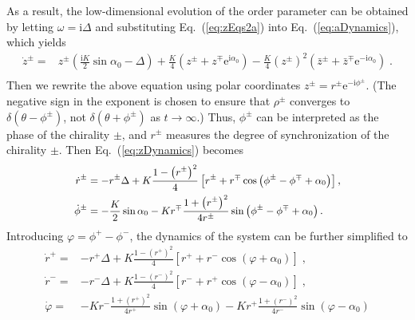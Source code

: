 \documentclass{article}
\begin{document}
As a result, the low-dimensional evolution of the order parameter can be obtained by letting $\omega =\mathrm{i}\Delta$ and substituting Eq.~(\ref{eq:zEqs2a}) into Eq.~(\ref{eq:aDynamics}), which yields
\begin{equation}
    \label{eq:zDynamics}
    \begin{aligned}
        \dot{z}^{\pm}=&z^{\pm}\left( \frac{\text{i}K}{2}\sin \alpha _0 - \Delta \right) +\frac{K}{4}\left( z^{\pm}+z^{\mp}\text{e}^{\text{i}\alpha _0} \right)-\frac{K}{4}\left( z^{\pm} \right) ^2\left( \bar{z}^{\pm}+\bar{z}^{\mp}\text{e}^{-\text{i}\alpha _0} \right) \;.\\
    \end{aligned}
\end{equation}
Then we rewrite the above equation using polar coordinates $z^{\pm}=r^{\pm}\mathrm{e}^{-\mathrm{i}\phi ^{\pm}}$. (The negative sign in the exponent is chosen to ensure that $\rho^{\pm}$ converges to $\delta\left(\theta-\phi^{\pm}\right)$, not $\delta\left(\theta+\phi^{\pm}\right)$ as $t\rightarrow\infty$.) Thus, $\phi^{\pm}$ can be interpreted as the phase of the chirality $\pm$, and $r^{\pm}$ measures the degree of synchronization of the chirality $\pm$. 
Then Eq.~(\ref{eq:zDynamics}) becomes
\begin{subequations}
    \small
    \begin{align}
        \dot{r}^{\pm}&=-r^{\pm}\Delta +K\frac{1 -\left( r^{\pm} \right) ^2}{4}\left[ r^{\pm}+r^{\mp}\cos \left( \phi ^{\pm}-\phi ^{\mp}+\alpha _0 \right) \right] ,\\
        \dot{\phi}^{\pm}&=-\frac{K}{2}\sin \alpha _0-Kr^{\mp}\frac{1+\left( r^{\pm} \right) ^2}{4r^{\pm}}\sin \left( \phi ^{\pm}-\phi ^{\mp}+\alpha _0 \right) .
    \end{align}
\end{subequations}
Introducing $\varphi=\phi^+-\phi^-$, the dynamics of the system can be further simplified to
\begin{subequations}
    \begin{align}
        \dot{r}^+=&-r^+\Delta +K\frac{1-\left( r^+ \right) ^2}{4}\left[ r^++r^-\cos \left( \varphi +\alpha _0 \right) \right] \;,\\
        \dot{r}^-=&-r^-\Delta +K\frac{1-\left( r^- \right) ^2}{4}\left[ r^-+r^+\cos \left( \varphi -\alpha _0 \right) \right] \;,\\
        \dot{\varphi}=&-Kr^-\frac{1+\left( r^+ \right) ^2}{4r^+}\sin \left( \varphi +\alpha _0 \right)-Kr^+\frac{1+\left( r^- \right) ^2}{4r^-}\sin \left( \varphi -\alpha _0 \right)
    \end{align}
\end{subequations}
\end{document}
